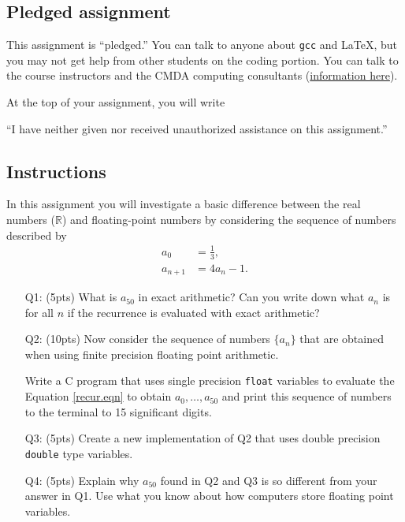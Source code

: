 
\subsection*{Pledged assignment}
This assignment is ``pledged.''
You can talk to anyone about \texttt{gcc} and \LaTeX{},
but you may not get help from other students on the coding portion.
You can talk to the course instructors and the CMDA computing consultants (\href{https://www.ais.science.vt.edu/cmda/our-program/cmdacomputingconsultants.html}{information here}).

\vspace{8pt}\noindent At the top of your assignment, you will write
\begin{center}
``I have neither given nor received unauthorized assistance on this assignment.''
\end{center}


\subsection*{Instructions}
In this assignment you will investigate a basic difference between the real numbers ($\mathbb R$) and floating-point numbers by considering the sequence of numbers described by
    \begin{align}
        a_0&=\frac13,\\
        a_{n+1}&=4a_n-1. \label{recur.eqn}
    \end{align}
    
\begin{enumerate}
    \item[Q1:] (5pts) What is $a_{50}$ in exact arithmetic? Can you write down what $a_n$ is for all $n$ if the recurrence is evaluated with exact arithmetic?
    \item[Q2:] (10pts) Now consider the sequence of numbers $\{a_n\}$ that are obtained when using finite precision floating point arithmetic.
    
    Write a C program that uses single precision \texttt{float} variables to evaluate the Equation \ref{recur.eqn} to obtain $a_0,\dots,a_{50}$ and print this sequence of numbers to the terminal to 15 significant digits.
   
    \item[Q3:] (5pts) Create a new implementation of Q2 that uses double precision \texttt{double} type variables. 
    \item[Q4:] (5pts) Explain why $a_{50}$ found in Q2 and Q3 is so different from your answer in Q1.
    Use what you know about how computers store floating point variables.
\end{enumerate}

